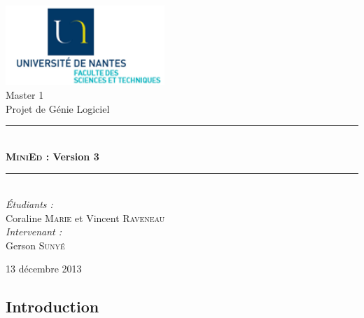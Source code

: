 \documentclass[a4paper]{article}
\newcommand{\HRule}{\rule{\linewidth}{0.5mm}}
\begin{document}

	\begin{titlepage}
		\begin{center}

			\includegraphics[width=0.45\textwidth]{UN-sciences.png}~\\[2cm]

			\LARGE{Master 1 }\\[1.5cm]

			\Large{Projet de Génie Logiciel}\\[0.5cm]

			\HRule \\[0.4cm]
			{ \huge \bfseries \textsc{MiniEd} : Version 3 \\[0.4cm] }
			\HRule \\[1.5cm]

			\normalsize		
			\emph{\'Etudiants :}\\
			Coraline \textsc{Marie} et Vincent \textsc{Raveneau}\\
			\vspace{0.5cm}
			\emph{Intervenant :} \\
			Gerson \textsc{Sunyé}
		
			\vfill

			{\large 13 décembre 2013}

		\end{center}
	\end{titlepage}



	\renewcommand{\contentsname}{Sommaire}
	\tableofcontents
	\newpage



	\begin{center}
		\section{Introduction}
	\end{center}
\end{document}

